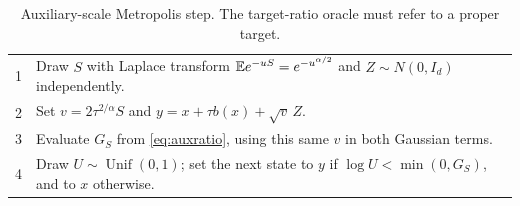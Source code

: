 \documentclass[pdflatex,iicol,sn-mathphys-ay]{sn-jnl}
\theoremstyle{definition}\newtheorem{definition}[theorem]{Definition}
\theoremstyle{remark}\newtheorem{remark}[theorem]{Remark}
\numberwithin{equation}{section}
\newcommand{\1}{\mathbf 1}
\begin{document}
\begin{table}[t]\centering
\caption{Auxiliary-scale Metropolis step. The target-ratio oracle must refer to a proper target.}\label{alg:aux}
\begin{tabular}{@{}p{.08\linewidth}p{.84\linewidth}@{}}\toprule
1 & Draw $S$ with Laplace transform $\mathbb E e^{-uS}=e^{-u^{\alpha/2}}$ and $Z\sim N(0,I_d)$ independently.\\[3pt]
2 & Set $v=2\tau^{2/\alpha}S$ and $y=x+\tau b(x)+\sqrt v\,Z$.\\[3pt]
3 & Evaluate $G_S$ from \eqref{eq:auxratio}, using this same $v$ in both Gaussian terms.\\[3pt]
4 & Draw $U\sim\operatorname{Unif}(0,1)$; set the next state to $y$ if $\log U<\min(0,G_S)$, and to $x$ otherwise.\\\bottomrule
\end{tabular}
\label{tab:algorithm}
\end{table}
\end{document}
